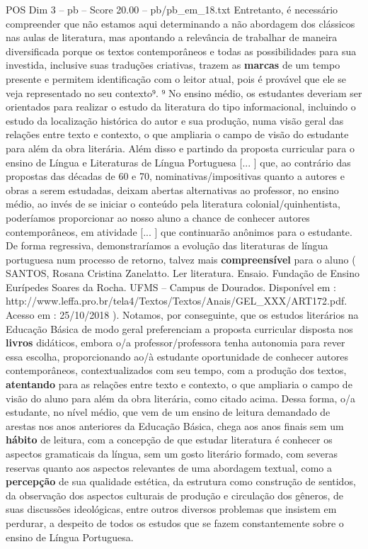 \begin{textsample}{POS Dim 3 – pb – Score 20.00 – pb/pb\_em\_18.txt}
Entretanto, é necessário compreender que não estamos aqui determinando a não abordagem dos clássicos nas aulas de literatura, mas apontando a relevância de trabalhar de maneira diversificada porque os textos contemporâneos e todas as possibilidades para sua investida, inclusive suas traduções criativas, trazem as \textbf{marcas} de um tempo presente e permitem identificação com o leitor atual, pois é provável que ele se veja representado no seu contexto⁹. ⁹ No ensino médio, os estudantes deveriam ser orientados para realizar o estudo da literatura do tipo informacional, incluindo o estudo da localização histórica do autor e sua produção, numa visão geral das relações entre texto e contexto, o que ampliaria o campo de visão do estudante para além da obra literária.
Além disso e partindo da proposta curricular para o ensino de Língua e Literaturas de Língua Portuguesa [... ] que, ao contrário das propostas das décadas de 60 e 70, nominativas/impositivas quanto a autores e obras a serem estudadas, deixam abertas alternativas ao professor, no ensino médio, ao invés de se iniciar o conteúdo pela literatura colonial/quinhentista, poderíamos proporcionar ao nosso aluno a chance de conhecer autores contemporâneos, em atividade [... ] que continuarão anônimos para o estudante.
De forma regressiva, demonstraríamos a evolução das literaturas de língua portuguesa num processo de retorno, talvez mais \textbf{compreensível} para o aluno ( SANTOS, Rosana Cristina Zanelatto.
Ler literatura.
Ensaio.
Fundação de Ensino Eurípedes Soares da Rocha.
UFMS – Campus de Dourados.
Disponível em : http://www.leffa.pro.br/tela4/Textos/Textos/Anais/GEL\_XXX/ART172.pdf.
Acesso em : 25/10/2018 ).
Notamos, por conseguinte, que os estudos literários na Educação Básica de modo geral preferenciam a proposta curricular disposta nos \textbf{livros} didáticos, embora o/a professor/professora tenha autonomia para rever essa escolha, proporcionando ao/à estudante oportunidade de conhecer autores contemporâneos, contextualizados com seu tempo, com a produção dos textos, \textbf{atentando} para as relações entre texto e contexto, o que ampliaria o campo de visão do aluno para além da obra literária, como citado acima.
Dessa forma, o/a estudante, no nível médio, que vem de um ensino de leitura demandado de arestas nos anos anteriores da Educação Básica, chega aos anos finais sem um \textbf{hábito} de leitura, com a concepção de que estudar literatura é conhecer os aspectos gramaticais da língua, sem um gosto literário formado, com severas reservas quanto aos aspectos relevantes de uma abordagem textual, como a \textbf{percepção} de sua qualidade estética, da estrutura como construção de sentidos, da observação dos aspectos culturais de produção e circulação dos gêneros, de suas discussões ideológicas, entre outros diversos problemas que insistem em perdurar, a despeito de todos os estudos que se fazem constantemente sobre o ensino de Língua Portuguesa.

\end{textsample}
